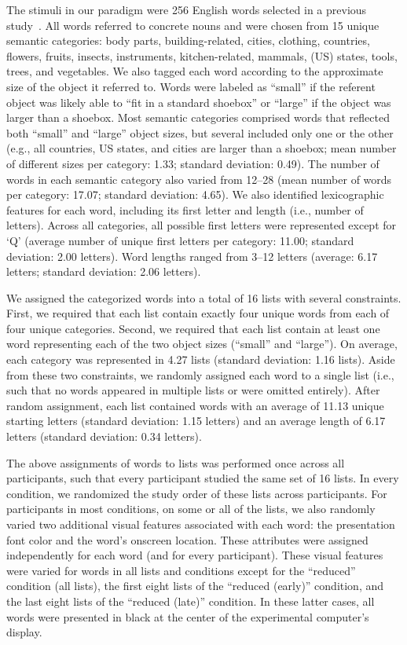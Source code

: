 \documentclass[11pt]{article}
\begin{document}
The stimuli in our paradigm were 256 English words selected in a previous
study~\citep{ZimaEtal18}. All words referred to concrete nouns and were chosen
from 15 unique semantic categories: body parts, building-related, cities,
clothing, countries, flowers, fruits, insects, instruments, kitchen-related,
mammals, (US) states, tools, trees, and vegetables. We also tagged each word
according to the approximate size of the object it referred to. Words were
labeled as ``small'' if the referent object was likely able to ``fit in a
standard shoebox'' or ``large'' if the object was larger than a shoebox. Most
semantic categories comprised words that reflected both ``small'' and ``large''
object sizes, but several included only one or the other (e.g., all countries,
US states, and cities are larger than a shoebox; mean number of different sizes
per category: 1.33; standard deviation: 0.49). The number of words in each
semantic category also varied from 12--28 (mean number of words per category:
17.07; standard deviation: 4.65). We also identified lexicographic features for
each word, including its first letter and length (i.e., number of letters).
Across all categories, all possible first letters were represented except for
`Q' (average number of unique first letters per category: 11.00; standard
deviation: 2.00 letters). Word lengths ranged from 3--12 letters (average: 6.17
letters; standard deviation: 2.06 letters).

We assigned the categorized words into a total of 16 lists with several
constraints. First, we required that each list contain exactly four unique
words from each of four unique categories. Second, we required that each list
contain at least one word representing each of the two object sizes (``small''
and ``large''). On average, each category was represented in 4.27 lists
(standard deviation: 1.16 lists). Aside from these two constraints, we randomly
assigned each word to a single list (i.e., such that no words appeared in
multiple lists or were omitted entirely). After random assignment, each list
contained words with an average of 11.13 unique starting letters (standard
deviation: 1.15 letters) and an average length of 6.17 letters (standard
deviation: 0.34 letters).

The above assignments of words to lists was performed once across all
participants, such that every participant studied the same set of 16 lists. In
every condition, we randomized the study order of these lists across
participants. For participants in most conditions, on some or all of the lists,
we also randomly varied two additional visual features associated with each
word: the presentation font color and the word's onscreen location. These
attributes were assigned independently for each word (and for every
participant). These visual features were varied for words in all lists and
conditions except for the ``reduced'' condition (all lists), the first eight
lists of the ``reduced (early)'' condition, and the last eight lists of the
``reduced (late)'' condition. In these latter cases, all words were presented
in black at the center of the experimental computer's display.
\end{document}
